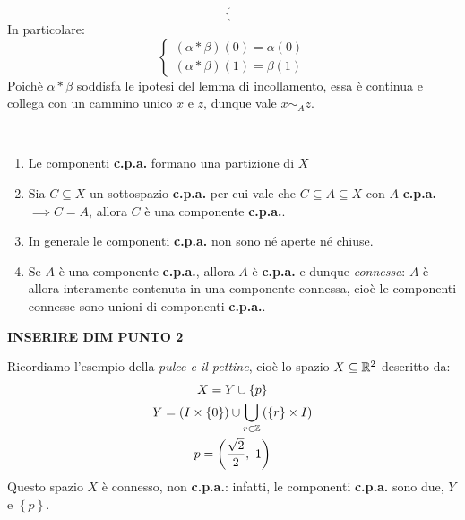 \begin{demonstration}
\begin{itemize}
\begin{equation}
\begin{cases}
	\end{cases}
\end{equation}
In particolare:
\begin{equation*}
	\begin{cases}
	\left(\alpha\ast\beta\right)\left(0\right)=\alpha\left(0\right)\\
	\left(\alpha\ast\beta\right)\left(1\right)=\beta\left(1\right)
		\end{cases}
\end{equation*}
Poichè $\alpha\ast\beta$ soddisfa le ipotesi del lemma di incollamento, essa è continua e collega con un cammino unico $x$ e $z$, dunque vale $x\sim_A z$.
	\end{itemize}
\end{demonstration}
\begin{observe}~{}
	\begin{enumerate}
		\item Le componenti \textbf{c.p.a.} formano una partizione di $X$
		\item Sia $C\subseteq X$ un sottospazio \textbf{c.p.a.} per cui vale che $C\subseteq A\subseteq X$ con $A$ \textbf{c.p.a.}$\implies C=A$, allora $C$ è una componente \textbf{c.p.a.}.
		\item In generale le componenti \textbf{c.p.a.} non sono né aperte né chiuse.
		\item Se $A$ è una componente \textbf{c.p.a.}, allora $A$ è \textbf{c.p.a.} e dunque \textit{connessa}: $A$ è allora interamente contenuta in una componente connessa, cioè le componenti connesse sono unioni di componenti \textbf{c.p.a.}.
	\end{enumerate}
\end{observe}
\begin{demonstration}
	\textbf{INSERIRE DIM PUNTO 2}
\end{demonstration}
\begin{example}
	Ricordiamo l'esempio della \textit{pulce e il pettine}, cioè lo spazio $X\subseteq \mathbb{R}^2$ descritto da:
	\begin{gather*}
		X=Y\cup \left\{p\right\}\\
		Y=\left(I\times \left\{0\right\}\right)\cup \mathop{{\bigcup}}\displaylimits_{r\in\mathbb{Z}}\left(\left\{r\right\}\times I\right)\\
		p=\left(\frac{\sqrt{2}}{2},\ 1\right)
	\end{gather*}
Questo spazio $X$ è connesso, non \textbf{c.p.a.}: infatti, le componenti \textbf{c.p.a.} sono due, $Y$ e $\left\{p\right\}$.
\end{example}

